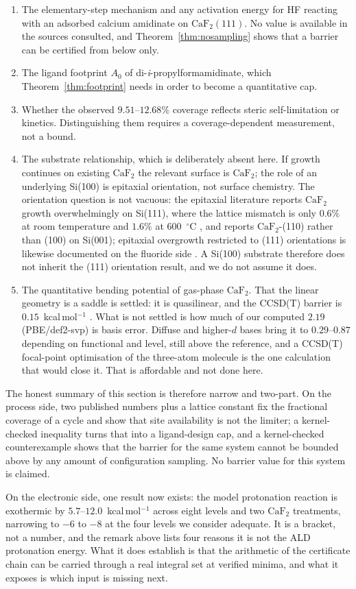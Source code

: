 \begin{enumerate}
\item The elementary-step mechanism and any activation energy for
HF reacting with an adsorbed calcium amidinate on $\mathrm{CaF_2}(111)$. No
value is available in the sources consulted, and Theorem~\ref{thm:nosampling}
shows that a barrier can be certified from below only.
\item The ligand footprint $A_0$ of di-\emph{i}-propylformamidinate, which
Theorem~\ref{thm:footprint} needs in order to become a quantitative cap.
\item Whether the observed $9.51$--$12.68\%$ coverage reflects steric
self-limitation or kinetics. Distinguishing them requires a coverage-dependent
measurement, not a bound.
\item The substrate relationship, which is deliberately absent here. If growth
continues on existing $\mathrm{CaF_2}$ the relevant surface is $\mathrm{CaF_2}$;
the role of an underlying Si(100) is epitaxial orientation, not surface
chemistry. The orientation question is not vacuous: the epitaxial literature
reports $\mathrm{CaF_2}$ growth overwhelmingly on Si(111), where the lattice
mismatch is only $0.6\%$ at room temperature and $1.6\%$ at $600$~$^\circ$C
\citep{Pilvi2007}, and reports $\mathrm{CaF_2}$-(110) rather than (100) on
Si(001); epitaxial overgrowth restricted to (111) orientations is likewise
documented on the fluoride side \citep{Chan2010}. A Si(100) substrate therefore
does not inherit the (111) orientation
result, and we do not assume it does.
\item The quantitative bending potential of gas-phase $\mathrm{CaF_2}$. That the
linear geometry is a saddle is settled: it is quasilinear, and the CCSD(T) barrier
is $0.15$~kcal\,mol$^{-1}$ \citep{Koput2004}. What is not settled is how much of
our computed $2.19$ (PBE/def2-svp) is basis error. Diffuse and higher-$d$ bases
bring it to $0.29$--$0.87$ depending on functional and level, still above the
reference, and a CCSD(T) focal-point optimisation of the three-atom molecule is the
one calculation that would close it. That is affordable and not done here.
\end{enumerate}

The honest summary of this section is therefore narrow and two-part. On the process
side, two published numbers plus a lattice constant fix the fractional coverage of
a cycle and show that site availability is not the limiter; a kernel-checked
inequality turns that into a ligand-design cap, and a kernel-checked counterexample
shows that the barrier for the same system cannot be bounded above by any amount of
configuration sampling. No barrier value for this system is claimed.

On the electronic side, one result now exists: the model protonation reaction is
exothermic by $5.7$--$12.0$~kcal\,mol$^{-1}$ across eight levels and two
$\mathrm{CaF_2}$ treatments, narrowing to $-6$ to $-8$ at the four levels we
consider adequate. It is a bracket, not a number, and the remark above lists four
reasons it is not the ALD protonation energy. What it does establish is that the
arithmetic of the certificate chain can be carried through a real integral set at
verified minima, and what it exposes is which input is missing next.
